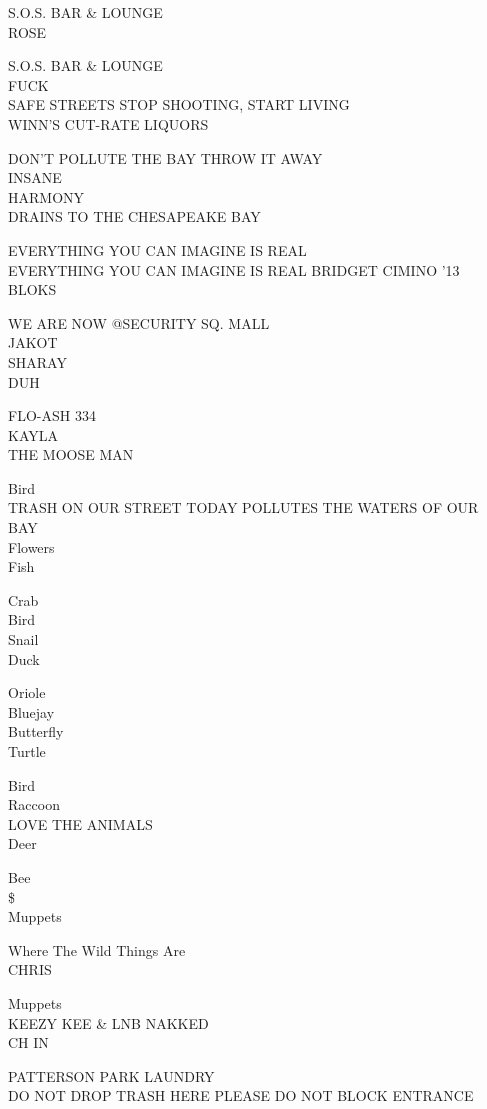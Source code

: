 \documentclass[10pt,letterpaper]{article}
\begin{document}
S.O.S. BAR \& LOUNGE\\
ROSE

S.O.S. BAR \& LOUNGE\\
FUCK\\
SAFE STREETS STOP SHOOTING, START LIVING\\
WINN'S CUT{-}RATE LIQUORS

DON'T POLLUTE THE BAY THROW IT AWAY\\
INSANE\\
HARMONY\\
DRAINS TO THE CHESAPEAKE BAY

EVERYTHING YOU CAN IMAGINE IS REAL\\
EVERYTHING YOU CAN IMAGINE IS REAL BRIDGET CIMINO '13\\
BLOKS

WE ARE NOW @SECURITY SQ. MALL\\
JAKOT\\
SHARAY\\
DUH

FLO{-}ASH 334\\
KAYLA\\
THE MOOSE MAN

Bird\\
TRASH ON OUR STREET TODAY POLLUTES THE WATERS OF OUR BAY\\
Flowers\\
Fish

Crab\\
Bird\\
Snail\\
Duck

Oriole\\
Bluejay\\
Butterfly\\
Turtle

Bird\\
Raccoon\\
LOVE THE ANIMALS\\
Deer

Bee\\
\$\\
Muppets

Where The Wild Things Are\\
CHRIS

Muppets\\
KEEZY KEE \& LNB NAKKED\\
CH IN

PATTERSON PARK LAUNDRY\\
DO NOT DROP TRASH HERE PLEASE DO NOT BLOCK ENTRANCE
\end{document}
